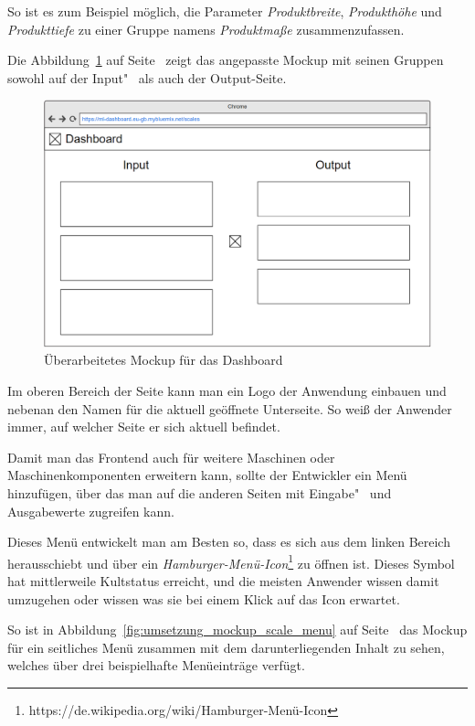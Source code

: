 So ist es zum Beispiel möglich, die Parameter \textit{Produktbreite}, \textit{Produkthöhe} und \textit{Produkttiefe} zu
einer Gruppe namens \textit{Produktmaße} zusammenzufassen.

Die Abbildung~\ref{fig:umsetzung_mockup_scale_2} auf Seite~\pageref{fig:umsetzung_mockup_scale_2} zeigt das angepasste
Mockup mit seinen Gruppen sowohl auf der Input"~ als auch der Output-Seite.

\begin{figure}[h]
    \centering
    \includegraphics[width=\textwidth]{images/kapitel_4/mockup_scale_2.png}
    \caption{Überarbeitetes Mockup für das Dashboard}
    \label{fig:umsetzung_mockup_scale_2}
\end{figure}

Im oberen Bereich der Seite kann man ein Logo der Anwendung einbauen und nebenan den Namen für die aktuell geöffnete
Unterseite. So weiß der Anwender immer, auf welcher Seite er sich aktuell befindet.

Damit man das Frontend auch für weitere Maschinen oder Maschinenkomponenten erweitern kann, sollte der Entwickler ein
Menü hinzufügen, über das man auf die anderen Seiten mit Eingabe"~ und Ausgabewerte zugreifen kann.

Dieses Menü entwickelt man am Besten so, dass es sich aus dem linken Bereich herausschiebt und über ein
\textit{Hamburger-Menü-Icon}\footnote{https://de.wikipedia.org/wiki/Hamburger-Menü-Icon} zu öffnen ist. Dieses Symbol
hat mittlerweile Kultstatus erreicht, und die meisten Anwender wissen damit umzugehen oder wissen was sie bei einem Klick
auf das Icon erwartet.

So ist in Abbildung~\ref{fig:umsetzung_mockup_scale_menu} auf Seite~\pageref{fig:umsetzung_mockup_scale_menu} das Mockup
für ein seitliches Menü zusammen mit dem darunterliegenden Inhalt zu sehen, welches über drei beispielhafte Menüeinträge
verfügt.

